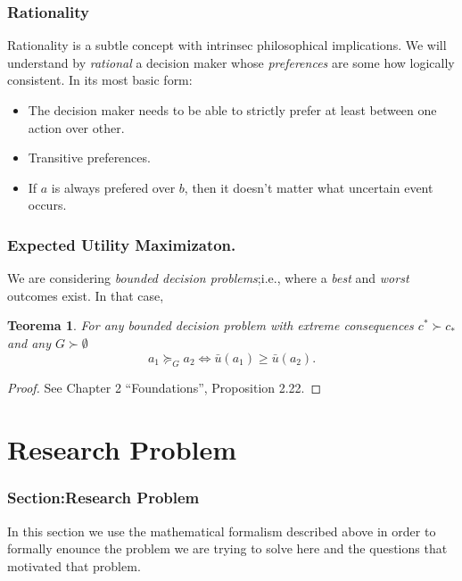 \documentclass{beamer}
\theoremstyle{plain}
\newtheorem{teo}{Teorema}
\begin{document}
	\begin{frame}
	\frametitle{Rationality}
	Rationality is a subtle concept with intrinsec philosophical implications. We will understand by \textit{rational} a decision maker whose \textit{preferences} are some how logically consistent.
	In its most basic form:
	\begin{itemize}
	\item The decision maker needs to be able to strictly prefer at least between one action over other.
	\item Transitive preferences.
	\item If $a$ is always prefered over $b$, then it doesn't matter what uncertain event occurs.
	\end{itemize}
	\end{frame}
	
	\begin{frame}
	\frametitle{Expected Utility Maximizaton.}
	We are considering \textit{bounded decision problems};i.e., where a \textit{best} and \textit{worst} outcomes exist. In that case,
	\begin{teo}
	For any bounded decision problem with extreme consequences $c^\ast \succ c_\ast$ and any $G \succ \emptyset$
	\[ a_1 \succeq_G a_2 \Leftrightarrow \bar{u}(a_1) \geq \bar{u}(a_2). \]
	\end{teo}
	\begin{proof}
	See \cite{bernardo2000bayesian} Chapter 2 “Foundations”, Proposition 2.22.
	\end{proof}
	\end{frame}

\section{Research Problem}
\begin{frame}
\frametitle{Section:Research Problem}
In this section we use the mathematical formalism described above in order to formally enounce the problem we are trying to solve here and the questions that motivated that problem. 
\end{frame}
\end{document}
